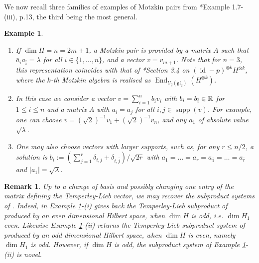 \documentclass[12pt, a4paper]{amsart}
\def\End{\operatorname{End}}
\def\supp{\operatorname{supp}}
\def\dim{\operatorname{dim}}
\def\id{\operatorname{id}}
\def\id{\operatorname{id}}
\def\supp{\operatorname{supp}}
\newtheorem{example}[theorem]{Example}
\newtheorem{remark}[theorem]{Remark}
\numberwithin{equation}{section}
\begin{document}
We now recall three families of examples of Motzkin pairs from \cite{ADR01}*{Example 1.7-(iii), p.13}, the third being   the most general.
\begin{example}\label{seriesofexamples}
 \begin{enumerate}
\item[i)] If $\dim H=n=2m+1$,
a Motzkin pair is provided by 
a matrix $A$ such that $\bar{a}_ia_{\bar i}=\lambda$ for all $i\in \{1, \ldots, n\}$, and a vector $v=v_{m+1}$.  
Note that for $n=3$, %
this representation coincides with that   
of \cite{Halverson}*{Section 3.4} on $(\id-p)^{\otimes k}H^{\otimes k}$, where the $k$-th Motzkin algebra is realised as
$\End_{U_q(\mathfrak{gl}_2)}(H^{\otimes k})$.
\item[ii)] In this case we consider a vector
  $v=\sum_{i=1}^n b_i v_i$ with 
$b_i=  b_{\bar{i}}\in\mathbb{R}$ for $1\leq i\leq n$ and a matrix $A$ with
 $a_i=a_{j}$ for all $i, j\in \supp(v)$.
For example, one can choose
$v= (\sqrt{2})^{-1}v_1+ (\sqrt{2})^{-1}v_n$,  and   
any $a_1$ of absolute value $\sqrt\lambda$. 
\item[iii)] One may also choose vectors with larger supports, such as, for any $r\leq n/2$, a solution is $b_i:=(\sum_{j=1}^r \delta_{i,j}+ \delta_{i,\bar{j}})/\sqrt{2r}$ with $a_1=\ldots =a_r=a_{\bar{1}}=\ldots =a_{\bar{r}}$ and $|a_1|=\sqrt\lambda$.
\end{enumerate}
 \end{example}  

\begin{remark}
Up to a change of basis and possibly changing one entry of the matrix defining the Temperley-Lieb vector, we may recover the subproduct systems 
of \cite{Nesh}.
Indeed, in Example \ref{seriesofexamples}-(i)  gives back the Temperley-Lieb subproduct of \cite{Nesh} produced by an 
even dimensional Hilbert space,
when  $\dim H$ is odd, i.e. $\dim H_1$ even.
Likewise Example \ref{seriesofexamples}-(ii) returns the Temperley-Lieb subproduct system of \cite{Nesh}
produced by an odd dimensional Hilbert space,
when $\dim H$ is even, namely $\dim H_1$ is odd. 
However, if  $\dim H$ is odd, the subproduct system of Example \ref{seriesofexamples}-(ii) is novel.
\end{remark}
\end{document}
